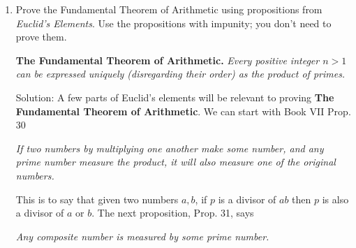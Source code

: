 \documentclass[10pt]{article}
\newcommand{\solution}{\color{blue} Solution: \color{black}}
\begin{document}
\begin{enumerate}
            \solution From our last solution we know
            \[\sum_{k=1}^n k^2 = \frac{n(n+1)(2n+1)}{6}\]
            So then we can show the following equality to prove the claim
            \[ \frac{n(n+1)(2n+1)}{6} = t_n + 2T_{n-1}\]
            Observe the following manipulations
            \begin{align*}
                \frac{n(n+1)(2n+1)}{6} &= t_n + 2T_{n-1}\\
                                       &= \frac{n(n+1)}{2} + 2 \sum_{i=1}^{n-1} \frac{i(i+1)}{2}\\
                                       &= \frac{n(n+1)}{2} + \frac{n(n-1)(n+1)}{3}\\
                                       &= \frac{3n(n+1) + 2n(n-1)(n+1)}{6} \\
                                       &= \frac{3n^2 + 3n + 2n^3 + 2n^2 - 2n^2 - 2n}{6} \\
                                       &= \frac{2n^3 + 3n^2 + n}{6} \\
                                       &= \frac{n(n+1)(2n+1)}{6} \\
            \end{align*}
            Therefore, $LHS = RHS. \hfill\blacksquare$
		
		\item Prove the Fundamental Theorem of Arithmetic using propositions from \emph{Euclid's Elements}. Use the propositions with impunity; you don't need to prove them. 
		
		{\bf The Fundamental Theorem of Arithmetic.} \emph{Every positive integer $n > 1$ can be expressed uniquely (disregarding their order) as the product of primes.}
		
        \solution A few parts of Euclid's elements will be relevant to proving \textbf{The Fundamental Theorem of Arithmetic}. We can start with Book VII Prop. 30
        \begin{center}
            \textit{If two numbers by multiplying one another make some number, and any prime number measure the product, it will also measure one of the original numbers.} 
        \end{center}

        This is to say that given two numbers $a,b$, if $p$ is a divisor of $ab$ then $p$ is also a divisor of $a$ or $b$. The next proposition, Prop. 31, says

        \begin{center}
            \textit{Any composite number is measured by some prime number. }
        \end{center}


\end{enumerate}
\end{document}
